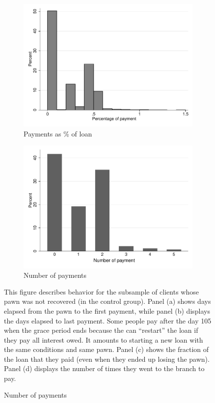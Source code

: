 \documentclass[oneside,11pt]{article}
\begin{document}
\begin{figure}[H]
\begin{center}
        \begin{subfigure}{0.40\textwidth}
        \caption{Payments as \% of loan}
        \centering
        \includegraphics[width=\textwidth]{Figuras/hist_percpay_default.pdf}
    \end{subfigure}
    \begin{subfigure}{0.40\textwidth}
        \caption{Number of payments}
        \centering
        \includegraphics[width=\textwidth]{Figuras/hist_numpay_default.pdf}
    \end{subfigure}
    \end{center}
        \scriptsize 
        This figure describes behavior for the subsample of clients whose pawn was not recovered (in the control group).  Panel (a) shows days elapsed from the pawn to the first payment, while panel (b) displays the days elapsed to last payment. Some people pay after the day 105 when the grace period ends because the can ``restart'' the loan if they pay all interest owed. It amounts to starting a new loan with the same conditions and same pawn. Panel (c) shows the fraction of the loan that they paid (even when they ended up losing the pawn). Panel (d) displays the number of times they went to the branch to pay.      
\end{figure}
\end{document}
